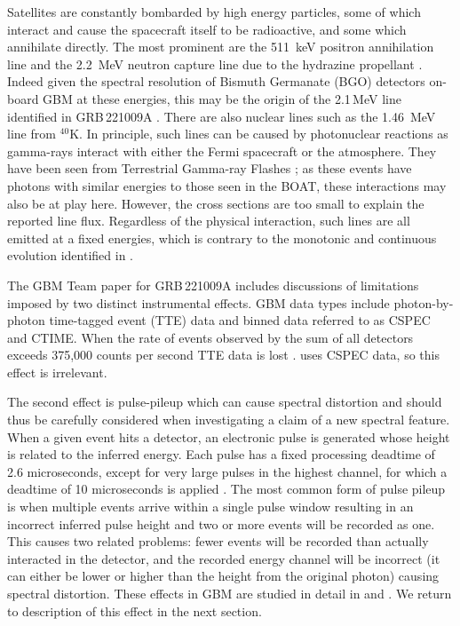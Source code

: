 \documentclass{aastex61}
\begin{document}
Satellites are constantly bombarded by high energy particles, some of which interact and cause the spacecraft itself to be radioactive, and some which annihilate directly. The most prominent are the 511~keV positron annihilation line and the 2.2~MeV neutron capture line due to the hydrazine propellant \citep{Meegan2009}. Indeed given the spectral resolution of Bismuth Germanate (BGO) detectors on-board GBM at these energies, this may be the origin of the 2.1\,MeV line identified in GRB\,221009A \citep{jiang2024discovery}. There are also nuclear lines such as the 1.46~MeV line from $^{40}$K. In principle, such lines can be caused by photonuclear reactions as gamma-rays interact with either the Fermi spacecraft or the atmosphere. They have been seen from Terrestrial Gamma-ray Flashes \citep{bowers2017gamma,rutjes2017tgf}; as these events have photons with similar energies to those seen in the BOAT, these interactions may also be at play here. However, the cross sections are too small to explain the reported line flux. Regardless of the physical interaction, such lines are all emitted at a fixed energies, which is contrary to the monotonic and continuous evolution identified in \citet{ravasio2024mega}.

The GBM Team paper for GRB\,221009A includes discussions of limitations imposed by two distinct instrumental effects. GBM data types include photon-by-photon time-tagged event (TTE) data  and binned data referred to as CSPEC and CTIME. When the rate of events observed by the sum of all detectors exceeds 375,000 counts per second TTE data is lost \citep{Meegan2009}. \citet{ravasio2024mega} uses CSPEC data, so this effect is irrelevant.

The second effect is pulse-pileup which can cause spectral distortion and should thus be carefully considered when investigating a claim of a new spectral feature. When a given event hits a detector, an electronic pulse is generated whose height is related to the inferred energy. Each pulse has a fixed processing deadtime of 2.6 microseconds, except for very large pulses in the highest channel, for which a deadtime of 10 microseconds is applied \citep{Meegan09}. The most common form of pulse pileup is when multiple events arrive within a single pulse window resulting in an incorrect inferred pulse height and two or more events will be recorded as one. This causes two related problems: fewer events will be recorded than actually interacted in the detector, and the recorded energy channel will be incorrect (it can either be lower or higher than the height from the original photon) causing spectral distortion. These effects in GBM are studied in detail in \citet{chaplin2013analytical} and \citet{bhat2014fermi}. We return to description of this effect in the next section. %
\end{document}
